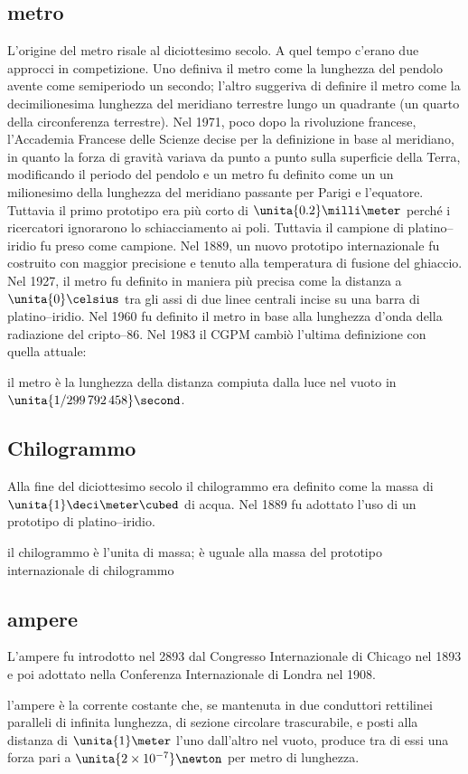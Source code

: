 \subsection{metro}
L'origine del metro risale al diciottesimo secolo. A quel tempo c'erano due approcci in competizione. Uno definiva il metro come la lunghezza del pendolo avente come semiperiodo un secondo; l'altro suggeriva di definire il metro come la decimilionesima lunghezza del meridiano terrestre lungo un quadrante (un quarto della circonferenza terrestre). Nel 1971, poco dopo la rivoluzione francese, l'Accademia Francese delle Scienze decise per la definizione in base al meridiano, in quanto la forza di gravità variava da punto a punto sulla superficie della Terra, modificando il periodo del pendolo e un metro fu definito come un un milionesimo della lunghezza del meridiano passante per Parigi e l'equatore. Tuttavia il primo prototipo era più corto di $\unita{0.2}\milli\meter$ perché i ricercatori ignorarono lo schiacciamento ai poli. Tuttavia il campione di platino--iridio fu preso come campione. Nel 1889, un nuovo prototipo internazionale fu costruito con maggior precisione e tenuto alla temperatura di fusione del ghiaccio. Nel 1927, il metro fu definito in maniera più precisa come la distanza a $\unita{0}\celsius$ tra gli assi di due linee centrali incise su una barra di platino--iridio. Nel 1960 fu definito il metro in base alla lunghezza d'onda della radiazione del cripto--86. Nel 1983 il CGPM cambiò l'ultima definizione con quella attuale:
\begin{definizioneunita}
il metro è la lunghezza della distanza compiuta dalla luce nel vuoto in  $\unita{1/299\,792\,458}\second$.
\end{definizioneunita}
\subsection{Chilogrammo}
Alla fine del diciottesimo secolo il chilogrammo era definito come la massa di $\unita{1}\deci\meter\cubed$ di acqua. Nel 1889 fu adottato l'uso di un prototipo di platino--iridio.
\begin{definizioneunita}
il chilogrammo è l'unita di massa; è uguale alla massa del prototipo internazionale di chilogrammo
\end{definizioneunita}
\subsection{ampere}
L'ampere fu introdotto nel 2893 dal Congresso Internazionale di Chicago nel 1893 e poi adottato nella Conferenza Internazionale di Londra nel 1908.
\begin{definizioneunita}
l'ampere è la corrente costante che, se mantenuta in due conduttori rettilinei paralleli di infinita lunghezza, di sezione circolare trascurabile, e posti alla distanza di $\unita{1}\meter$ l'uno dall'altro nel vuoto, produce tra di essi una forza pari a $\unita{2\times 10^{-7}}\newton$ per metro di lunghezza.
\end{definizioneunita}

